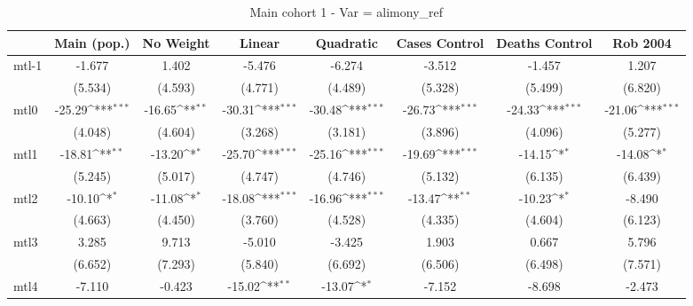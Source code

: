 \documentclass{article}
\begin{document}
{
\def\sym#1{\ifmmode^{#1}\else\(^{#1}\)\fi}
\begin{longtable}{l*{7}{c}}
\caption{Main cohort 1 - Var = alimony\_ref}\\
\hline\hline\endfirsthead\hline\endhead\hline\endfoot\endlastfoot
                &\multicolumn{1}{c}{Main (pop.)}&\multicolumn{1}{c}{No Weight}&\multicolumn{1}{c}{Linear}&\multicolumn{1}{c}{Quadratic}&\multicolumn{1}{c}{Cases Control}&\multicolumn{1}{c}{Deaths Control}&\multicolumn{1}{c}{Rob 2004}\\
\hline
mtl-1           &   -1.677         &    1.402         &   -5.476         &   -6.274         &   -3.512         &   -1.457         &    1.207         \\
                &  (5.534)         &  (4.593)         &  (4.771)         &  (4.489)         &  (5.328)         &  (5.499)         &  (6.820)         \\
mtl0            &   -25.29\sym{***}&   -16.65\sym{**} &   -30.31\sym{***}&   -30.48\sym{***}&   -26.73\sym{***}&   -24.33\sym{***}&   -21.06\sym{***}\\
                &  (4.048)         &  (4.604)         &  (3.268)         &  (3.181)         &  (3.896)         &  (4.096)         &  (5.277)         \\
mtl1            &   -18.81\sym{**} &   -13.20\sym{*}  &   -25.70\sym{***}&   -25.16\sym{***}&   -19.69\sym{***}&   -14.15\sym{*}  &   -14.08\sym{*}  \\
                &  (5.245)         &  (5.017)         &  (4.747)         &  (4.746)         &  (5.132)         &  (6.135)         &  (6.439)         \\
mtl2            &   -10.10\sym{*}  &   -11.08\sym{*}  &   -18.08\sym{***}&   -16.96\sym{***}&   -13.47\sym{**} &   -10.23\sym{*}  &   -8.490         \\
                &  (4.663)         &  (4.450)         &  (3.760)         &  (4.528)         &  (4.335)         &  (4.604)         &  (6.123)         \\
mtl3            &    3.285         &    9.713         &   -5.010         &   -3.425         &    1.903         &    0.667         &    5.796         \\
                &  (6.652)         &  (7.293)         &  (5.840)         &  (6.692)         &  (6.506)         &  (6.498)         &  (7.571)         \\
mtl4            &   -7.110         &   -0.423         &   -15.02\sym{**} &   -13.07\sym{*}  &   -7.152         &   -8.698         &   -2.473         \\

\end{longtable}}
\end{document}
